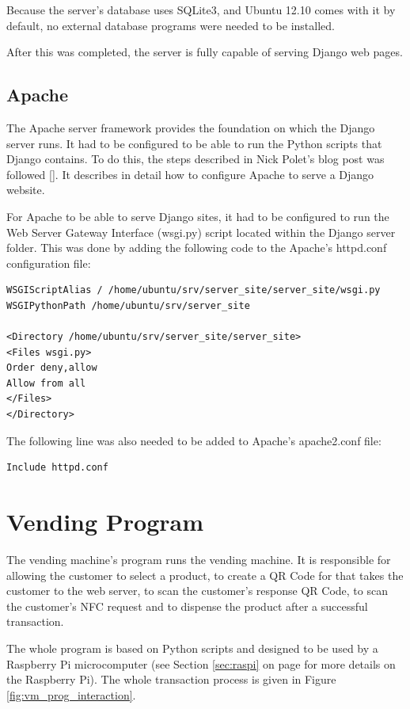 Because the server's database uses SQLite3, and Ubuntu 12.10 comes with it by default, no
external database programs were needed to be installed. 

After this was completed, the server is fully capable of serving Django web
pages.

\subsection{Apache}

The Apache server framework provides the foundation on which the Django server runs. It had to
be configured to be able to run the Python scripts that Django contains. To do this, the steps
described in Nick Polet's blog post was followed [\cite{article:apache-setup}]. It describes
in detail how to configure Apache to serve a Django website.

For Apache to be able to serve Django sites, it had to be configured to run the Web Server
Gateway Interface (wsgi.py) script located within the Django server folder. This was done by
adding the following code to the Apache's httpd.conf configuration file:

\begin{verbatim}
WSGIScriptAlias / /home/ubuntu/srv/server_site/server_site/wsgi.py
WSGIPythonPath /home/ubuntu/srv/server_site

<Directory /home/ubuntu/srv/server_site/server_site>
<Files wsgi.py>
Order deny,allow
Allow from all
</Files>
</Directory>
\end{verbatim}

The following line was also needed to be added to Apache's apache2.conf file:

\begin{verbatim}
Include httpd.conf
\end{verbatim}

\section{Vending Program}

The vending machine's program runs the vending machine. It is responsible for
allowing the customer to select a product, to create a QR Code for that takes the customer
to the web server, to scan the customer's response QR Code, to scan the customer's NFC
request and to dispense the product after a successful transaction. 

The whole program is based on Python scripts and
designed to be used by a Raspberry Pi microcomputer (see Section
\ref{sec:raspi} on page \pageref{sec:raspi} for more details on the Raspberry Pi). The whole
transaction process is given in Figure \ref{fig:vm_prog_interaction}.

